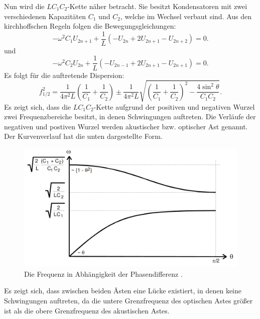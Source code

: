  Nun wird die $LC_1C_2$-Kette näher betracht. Sie besitzt Kondensatoren mit zwei
  verschiedenen Kapazitäten $C_1$ und $C_2$, welche im Wechsel verbaut sind.
 Aus den kirchhoffschen Regeln folgen die Bewegungsgleichungen:
 \begin{equation}
   -\omega^2 C_1 U_{2n+1} + \frac{1}{L} \left( -U_{2n} + 2U_{2n+1} - U_{2n+2} \right) = 0\text{.}
 \end{equation}
 und
 \begin{equation}
   -\omega^2 C_2 U_{2n} + \frac{1}{L} \left( -U_{2n-1} + 2U_{2n+1} - U_{2n+1} \right) = 0\text{.}
 \end{equation}
Es folgt für die auftretende Dispersion:
\begin{equation}
  f_{1/2}^2 = \frac{1}{4\pi^2L}\left(\frac{1}{C_1}+\frac{1}{C_2}\right) \pm \frac{1}{4\pi^2L}\sqrt{\left(\frac{1}{C_1}+\frac{1}{C_2} \right)^2 - \frac{4 \sin^2\theta}{C_1C_2}}\text{.}
\end{equation}
Es zeigt sich, dass die $LC_1C_2$-Kette aufgrund der positiven und negativen Wurzel
zwei Frequenzbereiche besitzt, in denen Schwingungen auftreten. Die Verläufe der
 negativen und postiven Wurzel werden akustischer bzw. optischer Ast genannt.
 Der Kurvenverlauf hat die unten dargestellte Form.
 \begin{figure}[H]
   \centering
   \includegraphics[width=\linewidth-200pt,height=\textheight-200pt,keepaspectratio]{content/Grafiken/Dispersionskurven.png}
   \caption{Die Frequenz in Abhängigkeit der Phasendifferenz \cite{V356}.}
   \label{fig:LC-Kette}
 \end{figure}
 Es zeigt sich, dass zwischen beiden Ästen eine Lücke existiert,
  in denen keine Schwingungen auftreten, da die untere Grenzfrequenz des
   optischen Astes größer ist als die obere Grenzfrequenz des akustischen Astes.



